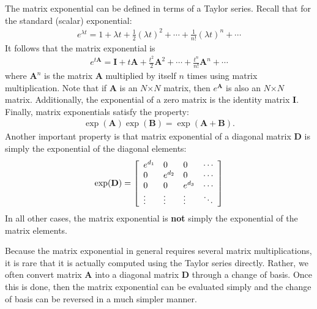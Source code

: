 The matrix exponential can be defined in terms of a Taylor series. Recall that for the standard (scalar) exponential:
\begin{align}
  e^{\lambda t} = 1 + \lambda t + \frac{1}{2} ( \lambda t )^2 + \cdots + \frac{1}{n!} ( \lambda t )^n + \cdots
\end{align}
It follows that the matrix exponential is
\begin{align}
  e^{t \mathbf{A}} = \mathbf{I} + t \mathbf{A} + \frac{t^2}{2} \mathbf{A}^2 + \cdots + \frac{t^n}{n!} \mathbf{A}^n + \cdots
\end{align}
where $\mathbf{A}^n$ is the matrix $\mathbf{A}$ multiplied by itself $n$ times using matrix multiplication. Note that if $\mathbf{A}$ is an $N$$\times$$N$ matrix, then $e^{\mathbf{A}}$ is also an $N$$\times$$N$ matrix. Additionally, the exponential of a zero matrix is the identity matrix $\mathbf{I}$. Finally, matrix exponentials satisfy the property:
\begin{align}
  \exp ( \mathbf{A} ) \exp ( \mathbf{B} ) = \exp ( \mathbf{A} + \mathbf{B} ).
\end{align}
Another important property is that matrix exponential of a diagonal matrix $\mathbf{D}$ is simply the exponential of the diagonal elements:
\begin{align}
   \exp ( \mathbf{D} ) = \left[ \begin{array}{l l l c}
   e^{d_1} & 0       & 0       & \cdots \\
   0       & e^{d_2} & 0       & \cdots \\
   0       & 0       & e^{d_3} & \cdots \\
   \vdots  & \vdots  & \vdots  & \ddots \\ \end{array} \right]
\end{align}
In all other cases, the matrix exponential is {\bf not} simply the exponential of the matrix elements.

Because the matrix exponential in general requires several matrix multiplications, it is rare that it is actually computed using the Taylor series directly. Rather, we often convert matrix $\mathbf{A}$ into a diagonal matrix $\mathbf{D}$ through a change of basis. Once this is done, then the matrix exponential can be evaluated simply and the change of basis can be reversed in a much simpler manner.

